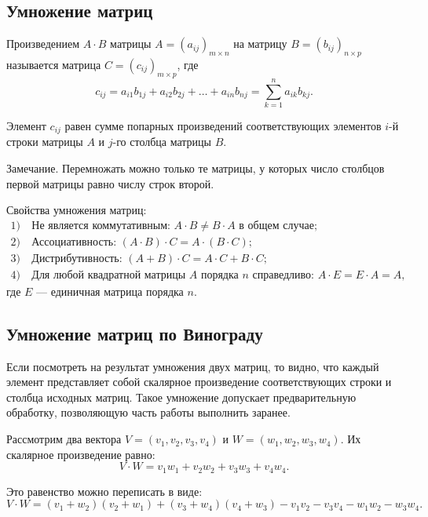 \subsection{Умножение матриц}

\begin{definition}
Произведением $A \cdot B$ матрицы $A = (a_{ij})_{m \times n}$ на матрицу $B = (b_{ij})_{n \times p}$ называется матрица $C = (c_{ij})_{m \times p}$, где
\[
c_{ij} = a_{i1}b_{1j} + a_{i2}b_{2j} + \dots + a_{in}b_{nj} = \sum_{k=1}^{n} a_{ik}b_{kj}.
\]
\end{definition}

Элемент $c_{ij}$ равен сумме попарных произведений соответствующих элементов $i$-й строки матрицы $A$ и $j$-го столбца матрицы $B$.

\noindent Замечание. Перемножать можно только те матрицы, у которых число столбцов первой матрицы равно числу строк второй.

\noindent Свойства умножения матриц:
\begin{align*}
1) \ & \text{Не является коммутативным: } A \cdot B \neq B \cdot A \text{ в общем случае}; \\
2) \ & \text{Ассоциативность: } (A \cdot B) \cdot C = A \cdot (B \cdot C); \\
3) \ & \text{Дистрибутивность: } (A + B) \cdot C = A \cdot C + B \cdot C; \\
4) \ & \text{Для любой квадратной матрицы } A \text{ порядка } n \text{ справедливо: } A \cdot E = E \cdot A = A,
\end{align*}
где $E$ — единичная матрица порядка $n$.
\cite{nikitenko}

\subsection{Умножение матриц по Винограду}

\hspace{1.25cm}
Если посмотреть на результат умножения двух матриц, то видно, что каждый элемент представляет собой скалярное произведение соответствующих строки и столбца исходных матриц. Такое умножение допускает предварительную обработку, позволяющую часть работы выполнить заранее.

Рассмотрим два вектора $V = (v_1, v_2, v_3, v_4)$ и $W = (w_1, w_2, w_3, w_4)$. Их скалярное произведение равно:
\[
V \cdot W = v_1 w_1 + v_2 w_2 + v_3 w_3 + v_4 w_4.
\]

Это равенство можно переписать в виде:
\[
V \cdot W = (v_1 + w_2)(v_2 + w_1) + (v_3 + w_4)(v_4 + w_3) - v_1 v_2 - v_3 v_4 - w_1 w_2 - w_3 w_4.
\]

